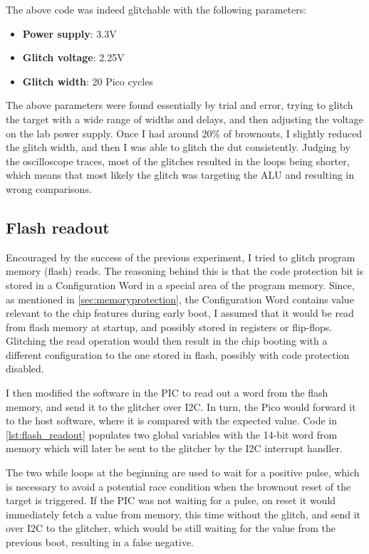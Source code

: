 \documentclass[a4paper,english,twoside,10pt]{article}
\begin{document}
The above code was indeed glitchable with the following parameters:
\begin{itemize}
	\item \textbf{Power supply}: 3.3V
	\item \textbf{Glitch voltage}: 2.25V
	\item \textbf{Glitch width}: 20 Pico cycles
\end{itemize}

The above parameters were found essentially by trial and error, trying to glitch the target with a wide range of widths and delays, and then adjusting the voltage on the lab power supply. Once I had around 20\% of brownouts, I slightly reduced the glitch width, and then I was able to glitch the \gls{dut} consistently.
Judging by the oscilloscope traces, most of the glitches resulted in the loops being shorter, which means that most likely the glitch was targeting the ALU and resulting in wrong comparisons.

\subsection{Flash readout}\label{sect:flashreadout}
Encouraged by the success of the previous experiment, I tried to glitch program memory (flash) reads. The reasoning behind this is that the code protection bit is stored in a Configuration Word in a special area of the program memory. Since, as mentioned in \autoref{sec:memoryprotection}, the Configuration Word contains value relevant to the chip features during early boot, I assumed that it would be read from flash memory at startup, and possibly stored in registers or flip-flops. Glitching the read operation would then result in the chip booting with a different configuration to the one stored in flash, possibly with code protection disabled.

I then modified the software in the PIC to read out a word from the flash memory, and send it to the glitcher over I2C. In turn, the Pico would forward it to the host software, where it is compared with the expected value. Code in \autoref{lst:flash_readout} populates two global variables with the 14-bit word from memory which will later be sent to the glitcher by the I2C interrupt handler.

The two while loops at the beginning are used to wait for a positive pulse, which is necessary to avoid a potential race condition when the brownout reset of the target is triggered. If the PIC was not waiting for a pulse, on reset it would immediately fetch a value from memory, this time without the glitch, and send it over I2C to the glitcher, which would be still waiting for the value from the previous boot, resulting in a false negative.
\end{document}
